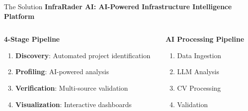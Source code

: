 \documentclass[aspectratio=169]{beamer}
\newcommand{\InfraRaderAI}{\textcolor{InfraRaderBlue}{InfraRader AI}}
\begin{document}
\begin{frame}{The Solution}
    \textbf{\InfraRaderAI{}: AI-Powered Infrastructure Intelligence Platform}
    
    \vspace{0.5cm}
    \begin{columns}
        \begin{column}{0.5\textwidth}
            \textbf{4-Stage Pipeline}
            \begin{enumerate}
                \item \textbf{Discovery}: Automated project identification
                \item \textbf{Profiling}: AI-powered analysis
                \item \textbf{Verification}: Multi-source validation
                \item \textbf{Visualization}: Interactive dashboards
            \end{enumerate}
        \end{column}
        \begin{column}{0.5\textwidth}
            \begin{center}
                \textbf{AI Processing Pipeline}
                \vspace{0.5cm}
                \begin{enumerate}
                    \item Data Ingestion
                    \item LLM Analysis
                    \item CV Processing
                    \item Validation
                \end{enumerate}
            \end{center}
        \end{column}
    \end{columns}
\end{frame}
\end{document}
